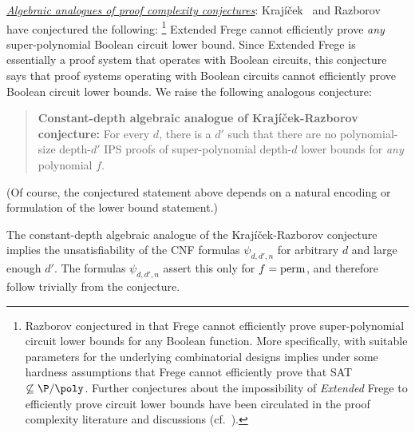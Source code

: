\documentclass[11pt,letter]{article}
\theoremstyle{remark} %
\newcommand{\perm}{{\rm perm}}
\begin{document}
{\medskip 

\textit{\uline{Algebraic analogues of proof complexity conjectures}}: Kraj\'{i}\v{c}ek~\cite{Krajicek04c} and Razborov~\cite{Razb96, Razb16} have conjectured the following:%
\footnote{Razborov conjectured in \cite{Razb15-annals} that Frege cannot efficiently prove super-polynomial circuit lower bounds for any Boolean function. More specifically, \cite[Conjecture 1]{Razb15-annals} with suitable parameters for the underlying combinatorial designs implies under some hardness assumptions that Frege cannot efficiently prove that SAT$\not\subseteq\P/{\poly}$. Further conjectures about the impossibility of \emph{Extended} Frege to efficiently prove circuit lower bounds have been circulated in the proof complexity literature and discussions  (cf.~\cite{Razb-2016-talk,Razb-2021-talk,Kra11}).}
Extended Frege cannot efficiently prove {\it any} super-polynomial Boolean circuit lower bound.
Since Extended Frege is essentially a proof system that operates with Boolean circuits, this conjecture says that proof systems operating with Boolean circuits cannot efficiently prove Boolean circuit lower bounds. 
We raise the following analogous conjecture: 


\begin{quote}
\textbf{Constant-depth algebraic analogue of 
 Kraj\'{i}\v{c}ek-Razborov conjecture:}
For every $d$, there is a $d'$ such that there are no polynomial-size depth-$d'$ IPS proofs of super-polynomial depth-$d$ lower bounds for {\it any} polynomial $f$. \end{quote}
(Of course, the conjectured statement above depends on a natural encoding or formulation of the lower bound statement.)      


%
%
The constant-depth algebraic analogue of 
the Kraj\'{i}\v{c}ek-Razborov conjecture implies the unsatisfiability of the CNF formulas $\psi_{d,d',n}$ for arbitrary $d$ and large enough $d'$. 
%
%
The formulas $\psi_{d,d',n}$ assert this only for $f = \perm$, and therefore follow trivially from the conjecture.

}
\end{document}
